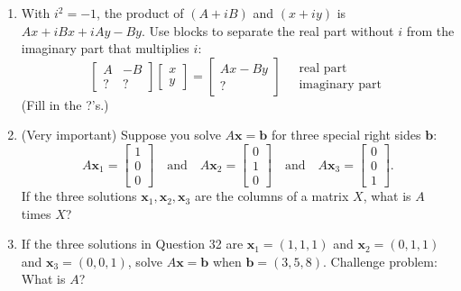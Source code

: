 \documentclass[14pt, a4paper]{article}
\begin{document}
\begin{enumerate}[resume]
    \item With $i^2 = -1$, the product of $(A + iB)$ and $(x + iy)$ is $Ax + iBx + iAy - By$. Use blocks to separate the real part without $i$ from the imaginary part that multiplies $i$:
          \[
              \begin{bmatrix} A & -B \\ ? & ? \end{bmatrix}
              \begin{bmatrix} x \\ y \end{bmatrix}
              = \begin{bmatrix} Ax - By \\ ? \end{bmatrix}
              \quad
              \begin{matrix}
                  \text{real part} \\ \text{imaginary part}
              \end{matrix}
          \]
          (Fill in the ?'s.)

    \item (Very important) Suppose you solve $A\boldsymbol{x} = \boldsymbol{b}$ for three special right sides $\boldsymbol{b}$:
          \[
              A\boldsymbol{x}_1 = \begin{bmatrix} 1 \\ 0 \\ 0 \end{bmatrix}
              \quad\text{and}\quad
              A\boldsymbol{x}_2 = \begin{bmatrix} 0 \\ 1 \\ 0 \end{bmatrix}
              \quad\text{and}\quad
              A\boldsymbol{x}_3 = \begin{bmatrix} 0 \\ 0 \\ 1 \end{bmatrix}.
          \]
          If the three solutions $\boldsymbol{x}_1, \boldsymbol{x}_2, \boldsymbol{x}_3$ are the columns of a matrix $X$, what is $A$ times $X$?

    \item If the three solutions in Question 32 are $\boldsymbol{x}_1 = (1,1,1)$ and $\boldsymbol{x}_2 = (0,1,1)$ and $\boldsymbol{x}_3 = (0,0,1)$, solve $A\boldsymbol{x} = \boldsymbol{b}$ when $\boldsymbol{b} = (3,5,8)$. Challenge problem: What is $A$?


\end{enumerate}
\end{document}
